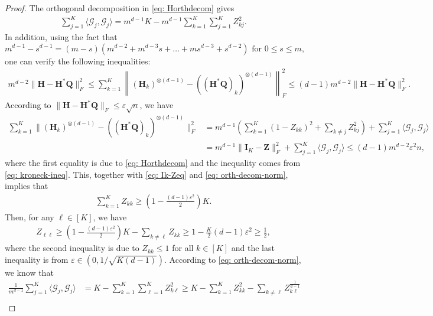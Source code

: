 \documentclass{article}
\theoremstyle{plain}
\theoremstyle{definition}
\theoremstyle{remark}
\newcommand{\BH}{\bm{H}}
\newcommand{\BQ}{\bm{Q}}
\newcommand{\GCal}{\mathcal{G}}
\begin{document}
\begin{appendix}
\begin{center}
\begin{proof}
			The orthogonal decomposition in \eqref{eq: Horthdecom} gives
			\begin{align} \label{eq: orth-decom-norm}
				\sum_{j=1}^K \langle \GCal_j, \GCal_j \rangle = m^{d-1}K - m^{d-1} \sum_{k=1}^K \sum_{j=1}^K Z_{kj}^2.
			\end{align}
			In addition, using the fact that
			\begin{equation*}
				m^{d-1} - s^{d-1} = (m-s)\left(m^{d-2} + m^{d-3}s + \dots + ms^{d-3} + s^{d-2}\right) \text{ for } 0 \leq s \leq m,
			\end{equation*} one can verify the following inequalities:
			\begin{align} \label{eq: kroneck-ineq}
				m^{d-2} \| \BH - \BH^* \BQ\|_F^2 \leq \sum_{k=1}^K \left\| (\BH_k)^{\otimes (d-1)} - ((\BH^* \BQ)_k)^{\otimes (d-1)} \right\|_F^2 \leq (d-1)m^{d-2}\| \BH - \BH^* \BQ\|_F^2.
			\end{align}
			According to $\| \BH - \BH^* \BQ\|_F \leq \varepsilon \sqrt{n}$, we have
			\begin{align*}
				\sum_{k=1}^K \| (\BH_k)^{\otimes (d-1)} - ((\BH^* \BQ)_k)^{\otimes (d-1)}\|_F^2  & = m^{d-1} \left(\sum_{k=1}^K (1- Z_{kk})^2 + \sum_{k\neq j} Z_{kj}^2 \right) + \sum_{j=1}^K \langle \GCal_j, \GCal_j \rangle \\
				& = m^{d-1} \|\bm{I}_K - \bm{Z} \|_F^2 + \sum_{j=1}^K \langle \GCal_j, \GCal_j \rangle \leq (d-1)m^{d-2}\varepsilon^2 n,
			\end{align*}
			where the first equality is due to \eqref{eq: Horthdecom} and the inequality comes from \eqref{eq: kroneck-ineq}.
			This, together with \eqref{eq: Ik-Zeq} and \eqref{eq: orth-decom-norm}, implies that
			\begin{align}
				\sum_{k=1}^K Z_{kk} \geq \left(1-\frac{(d-1)\varepsilon^2}{2}\right)K.
			\end{align}
			Then, for any $\ell \in [K]$, we have
			\begin{align}\label{eq: zkk1over2}
				Z_{\ell\ell} \geq \left(1-\frac{(d-1)\varepsilon^2}{2}\right)K - \sum_{k\neq \ell}Z_{kk}  \geq 1- \frac{K}{2}(d-1)\varepsilon^2 \geq \frac{1}{2},
			\end{align}
			where the second inequality is due to $Z_{kk}\leq 1$ for all $k \in [K]$ and the last inequality is from $\varepsilon \in (0,1/\sqrt{K(d-1)})$.
			According to \eqref{eq: orth-decom-norm}, we know that
			\begin{align}
				\frac{1}{m^{d-1}}\sum_{j=1}^K \langle \GCal_j, \GCal_j \rangle &=  K - \sum_{k=1}^K \sum_{\ell=1}^K Z_{k\ell}^2 \geq K - \sum_{k=1}^K Z_{kk}^2 - \sum_{k\neq \ell}Z_{k\ell}^{\frac{1}{d-1}} \nonumber \\

\end{align}
\end{proof}
\end{center}
\end{appendix}
\end{document}
